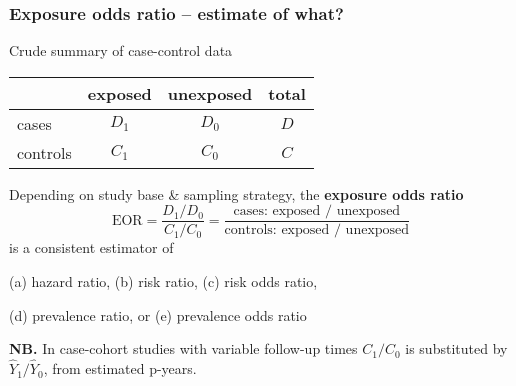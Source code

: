 \documentclass[12pt,dvipsnames,t,handout%
,aspectratio=169%
]{beamer}
\begin{document}
\begin{comment}
\pause
\bi
\item Textbook dogma: 
  ``Case-control studies: Only odds ratio is estimable, and it
  approximates relative risk with rare diseases.''
\pause
\medskip
\item
What is this ubiquitous ``relative risk''? 
\pause
\bi
\item[--] rate ratio or hazard ratio (HR)? 
\medskip
\item[--] cumulative incidence ratio or risk ratio (RR)?
\medskip
\item[--] prevalence ratio (PR)?
\ei   
\pause 
\medskip
\item
{\bf NB.} 
Sometimes hazard ratio 
= prevalence odds ratio.
 \\
{\small (see e.g. Keiding {\it JRSSA}, 1991; Alho, J. {\it Biometrics}, 1992; and Kari Auranen's talk at NBBC11)}.    
\ei  
\end{frame}

\end{comment}

\begin{frame}
\frametitle{\large Exposure odds ratio -- estimate of what?}

\bi
\item
Crude summary of case-control data

\medskip
\begin{center}
\begin{tabular}{l c c c}
\hline
               & exposed & unexposed & total\\
\hline
cases          & $D_1$     & $D_0$       & $D$\\
controls       & $C_1$     & $C_0$       & $C$\\
\hline
\end{tabular}
\end{center}

\pause
\bigskip
\item  Depending on study base \& sampling strategy,   
the {\bf exposure odds ratio} %
$$
  \text{EOR} 
    = \frac{D_1/ D_0}{C_1/C_0}
    = \frac{\text{cases: exposed / unexposed}}
           {\text{controls: exposed / unexposed}}
$$
\pause
is a consistent estimator of  
\bi
{\normalsize 
\item[ ]
 (a) hazard ratio, (b) risk ratio,
(c) risk odds ratio, \pause \medskip
\item[ ] (d) prevalence ratio, or (e) prevalence
odds ratio 
}
\ei
\pause
\item {\bf NB.} In case-cohort studies with variable follow-up times
$C_1/C_0$ is substituted by $\widehat Y_{1}/\widehat Y_{0}$, 
from estimated p-years.
      
 \ei  
\end{frame}
\end{document}
